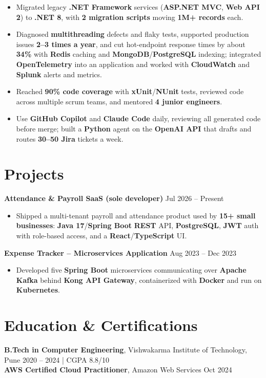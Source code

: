 \documentclass[a4paper,10pt]{article}
\begin{document}
\begin{itemize}[leftmargin=*]
    \item Migrated legacy \textbf{.NET Framework} services (\textbf{ASP.NET MVC}, \textbf{Web API 2}) to \textbf{.NET 8}, with \textbf{2 migration scripts} moving \textbf{1M+ records} each.
    \item Diagnosed \textbf{multithreading} defects and flaky tests, supported production issues \textbf{2--3 times a year}, and cut hot-endpoint response times by about \textbf{34\%} with \textbf{Redis} caching and \textbf{MongoDB}/\textbf{PostgreSQL} indexing; integrated \textbf{OpenTelemetry} into an application and worked with \textbf{CloudWatch} and \textbf{Splunk} alerts and metrics.
    \item Reached \textbf{90\% code coverage} with \textbf{xUnit}/\textbf{NUnit} tests, reviewed code across multiple scrum teams, and mentored \textbf{4 junior engineers}.
    \item Use \textbf{GitHub Copilot} and \textbf{Claude Code} daily, reviewing all generated code before merge; built a \textbf{Python} agent on the \textbf{OpenAI API} that drafts and routes \textbf{30--50 Jira} tickets a week.
\end{itemize}

\section*{Projects}

\textbf{Attendance \& Payroll SaaS (sole developer)} \hfill Jul 2026 -- Present
\begin{itemize}[leftmargin=*]
    \item Shipped a multi-tenant payroll and attendance product used by \textbf{15+ small businesses}: \textbf{Java 17}/\textbf{Spring Boot} \textbf{REST} API, \textbf{PostgreSQL}, \textbf{JWT} auth with role-based access, and a \textbf{React}/\textbf{TypeScript} UI.
\end{itemize}

\textbf{Expense Tracker -- Microservices Application} \hfill Aug 2023 -- Dec 2023
\begin{itemize}[leftmargin=*]
    \item Developed five \textbf{Spring Boot} microservices communicating over \textbf{Apache Kafka} behind \textbf{Kong API Gateway}, containerized with \textbf{Docker} and run on \textbf{Kubernetes}.
\end{itemize}

\section*{Education \& Certifications}
\textbf{B.Tech in Computer Engineering}, Vishwakarma Institute of Technology, Pune \hfill 2020 -- 2024 \;|\; CGPA 8.8/10 \\
\textbf{AWS Certified Cloud Practitioner}, Amazon Web Services \hfill Oct 2024
\end{document}

